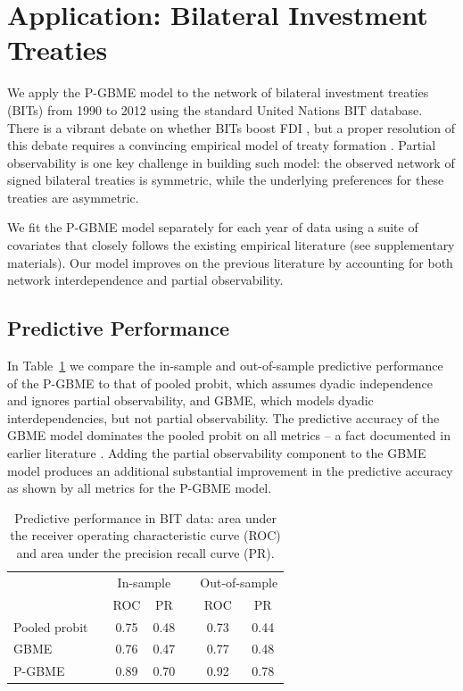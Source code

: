 \section{Application: Bilateral Investment Treaties}

We apply the P-GBME model to the network of bilateral investment treaties (BITs) from 1990 to 2012 using the standard United Nations BIT database. There is a vibrant debate on whether BITs boost FDI \citep{jandhyala:etal:2011, simmons:2014,minhas:2016}, but a proper resolution of this debate requires a convincing empirical model of treaty formation \citep{rosendorff:shin:2012}. Partial observability is one key challenge in building such model: the observed network of signed bilateral treaties is symmetric, while the underlying preferences for these treaties are  asymmetric. 

We fit the P-GBME model separately for each year of data using a suite of covariates that closely follows  the existing empirical literature (see supplementary materials). Our model improves on the previous literature by accounting for both network interdependence and partial observability. 

\subsection{Predictive Performance}

In Table~\ref{tab:perfAssess} we compare the in-sample and out-of-sample predictive performance of the P-GBME to that of pooled probit, which assumes dyadic independence and ignores partial observability, and GBME, which models dyadic interdependencies, but not partial observability. The predictive accuracy of the GBME model dominates the pooled probit on all metrics -- a fact documented in earlier literature  \citep{ward:hoff:2007, ward:etal:2012}. Adding the partial observability component to the GBME model produces an additional substantial improvement in the predictive accuracy as shown by all metrics for the P-GBME model.%

\begin{table}[h!]
\centering
\begin{tabular}{lcccccc}
\toprule
& & \multicolumn{2}{c}{In-sample} & & \multicolumn{2}{c}{Out-of-sample} \\
\cmidrule{3-4}\cmidrule{6-7}
& & ROC & PR & & ROC & PR\\
\midrule
Pooled probit& & 0.75 & 0.48 &  & 0.73 & 0.44\\
GBME && 0.76 & 0.47 & & 0.77 & 0.48 \\
P-GBME && 0.89 & 0.70 & & 0.92 & 0.78 \\
\bottomrule
\end{tabular}
\caption{Predictive performance in BIT data: area under the receiver operating characteristic curve (ROC) and area under the precision recall curve (PR).}
\label{tab:perfAssess}
\end{table} 

